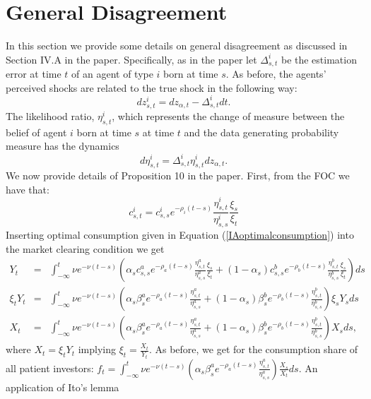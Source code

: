 \section{General Disagreement}

In this section we provide some details on general disagreement as discussed in Section IV.A in the paper. Specifically, as in the paper let $\Delta^i_{s,t}$ be the estimation error  at time $t$ of an agent of type $i$ born at time $s$. As before, the agents' perceived shocks are related to the true shock in the following way:
\begin{equation}
	dz^i_{s,t} = dz_{\alpha,t} - \Delta^i_{s,t}dt.
\end{equation}
The likelihood ratio, $\eta^i_{s,t}$, which represents the change of measure between the belief of agent $i$ born at time $s$ at time $t$ and the data generating probability measure has the dynamics
\begin{equation}
	d\eta^i_{s,t} = \Delta^i_{s,t} \eta^i_{s,t}dz_{\alpha,t}.
\end{equation}
We now provide details of Proposition 10 in the paper. First, from the FOC we have that:
\begin{equation}\label{IAoptimalconsumption}
	 c^i_{s,t} =c^i_{s,s} e^{-\rho_i \left(t-s\right)}\frac{\eta^i_{s,t}}{\eta^i_{s,s}} \frac{\xi_{s}}{\xi_{t}}
\end{equation}
Inserting optimal consumption given in Equation (\ref{IAoptimalconsumption}) into the market clearing condition we get
\begin{eqnarray}
	Y_t &=& \int_{-\infty}^{t} \nu e^{-\nu\left(t-s\right)}\left(\alpha_s c^a_{s,s} e^{-\rho_a \left(t-s\right)}\frac{\eta^a_{s,t}}{\eta^a_{s,s}} \frac{\xi_{s}}{\xi_{t}} + \left(1-\alpha_s\right)c^b_{s,s} e^{-\rho_b \left(t-s\right)}\frac{\eta^b_{s,t}}{\eta^b_{s,s}} \frac{\xi_{s}}{\xi_{t}}\right)ds \nonumber \\
	\xi_t Y_t &=& \int_{-\infty}^{t} \nu e^{-\nu\left(t-s\right)}\left(\alpha_s \beta^a_{s}e^{-\rho_a \left(t-s\right)}\frac{\eta^a_{s,t}}{\eta^a_{s,s}} + \left(1-\alpha_s\right)\beta^b_s e^{-\rho_b \left(t-s\right)}\frac{\eta^b_{s,t}}{\eta^b_{s,s}}\right)\xi_s Y_s ds \nonumber \\
		X_t &=& \int_{-\infty}^{t} \nu e^{-\nu\left(t-s\right)}\left(\alpha_s \beta^a_{s}e^{-\rho_a \left(t-s\right)}\frac{\eta^a_{s,t}}{\eta^a_{s,s}} + \left(1-\alpha_s\right)\beta^b_s e^{-\rho_b \left(t-s\right)}\frac{\eta^b_{s,t}}{\eta^b_{s,s}}\right)X_s ds, 
\end{eqnarray}
where $X_t = \xi_t Y_t$ implying $\xi_t = \frac{X_t}{Y_t}$. As before, we get for the consumption share of all patient investors:  $f_t = \int_{-\infty}^{t} \nu e^{-\nu\left(t-s\right)}\left(\alpha_s \beta^a_{s}e^{-\rho_a \left(t-s\right)}\frac{\eta^a_{s,t}}{\eta^a_{s,s}}\right)\frac{X_s}{X_t} ds$. An application of Ito's lemma 
